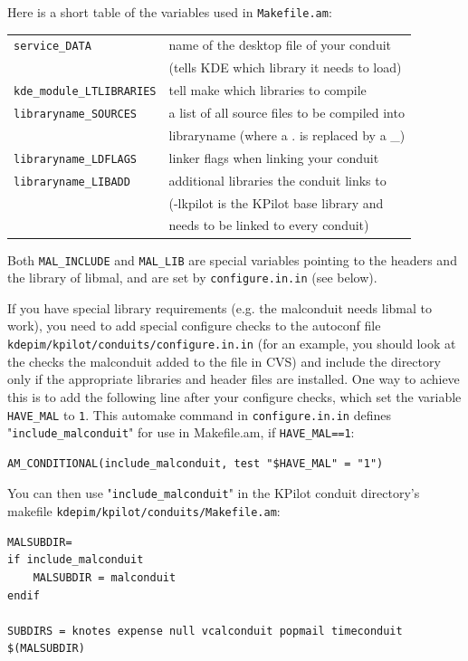 \documentclass[10pt,a4paper]{article}
\newcommand{\code}[1]{{\small\texttt{#1}}}
\newcommand{\file}[1]{{\small\texttt{#1}}}
\begin{document}
Here is a short table of the variables used in \file{Makefile.am}:

\begin{tabular}{ll}
\code{service\_DATA} & name of the desktop file of your conduit \\
        &(tells KDE which library it needs to load)\\
\code{kde\_module\_LTLIBRARIES} & tell make which libraries to compile\\
\code{libraryname\_SOURCES} & a list of all source files to be compiled into \\
        &libraryname (where a . is replaced by a \_)\\
\code{libraryname\_LDFLAGS} & linker flags when linking your conduit \\
\code{libraryname\_LIBADD} & additional libraries the conduit links to \\
        &(-lkpilot is the KPilot base library and\\
        & needs to be linked to every conduit)
\end{tabular}

\vspace{0.5em}

Both \code{MAL\_INCLUDE} and \code{MAL\_LIB} are special variables 
pointing to the headers and the library of libmal, and are set by 
\file{configure.in.in} (see below).

\vspace{1em}

If you have special library requirements (e.g. the malconduit needs libmal to work), 
you need to add special configure checks to the autoconf file \file{kdepim/kpilot/conduits/configure.in.in} (for an 
example, you should look at the checks the malconduit added to the file in CVS) 
and include the directory only if the appropriate libraries and header files are installed. 
One way to achieve this is to add the following line after your configure checks, which set 
the variable \code{HAVE\_MAL} to \code{1}. This automake command in 
\file{configure.in.in} defines "\code{include\_malconduit}" for use 
in Makefile.am, if \code{HAVE\_MAL==1}:
{\small\begin{verbatim}
AM_CONDITIONAL(include_malconduit, test "$HAVE_MAL" = "1")
\end{verbatim}
}

You can then use "\code{include\_malconduit}" in the KPilot conduit 
directory's makefile \file{kdepim/kpilot/conduits/Makefile.am}:
{\footnotesize
\begin{verbatim}
MALSUBDIR=
if include_malconduit
    MALSUBDIR = malconduit
endif

SUBDIRS = knotes expense null vcalconduit popmail timeconduit $(MALSUBDIR)
\end{verbatim}
}
\end{document}
